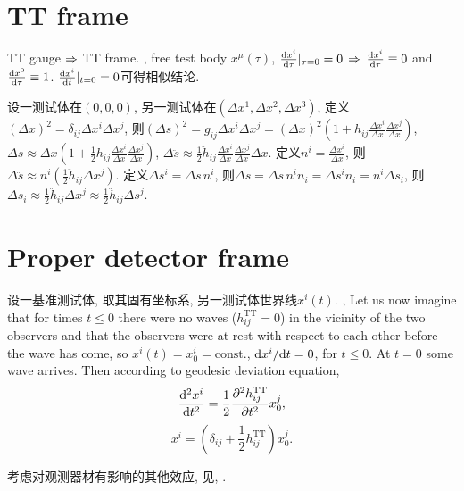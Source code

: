 \section{TT frame}

TT gauge $\Rightarrow$ TT frame. \cite{Maggiore2014}, free test body $x^\mu(\tau)$, $\frac{\mathrm{d} x^i}{\mathrm{d} \tau}|_{\tau=0}=0$ $\Rightarrow$ $\frac{\mathrm{d} x^i}{\mathrm{d} \tau}\equiv0$ and $\frac{\mathrm{d} x^0}{\mathrm{d} \tau}\equiv1$. $\frac{\mathrm{d} x^i}{\mathrm{d} t}|_{t=0}=0$可得相似结论.

设一测试体在$(0,0,0)$, 另一测试体在$(\Delta x^1,\Delta x^2,\Delta x^3)$, 定义$(\Delta x)^2=\delta_{ij}\Delta x^i\Delta x^j$, 则$(\Delta s)^2=g_{ij}\Delta x^i\Delta x^j=(\Delta x)^2(1+h_{ij}\frac{\Delta x^i}{\Delta x}\frac{\Delta x^j}{\Delta x})$, $\Delta s\approx\Delta x(1+\frac{1}{2}h_{ij}\frac{\Delta x^i}{\Delta x}\frac{\Delta x^j}{\Delta x})$, $\Delta \ddot{s}\approx\frac{1}{2}\ddot{h}_{ij}\frac{\Delta x^i}{\Delta x}\frac{\Delta x^j}{\Delta x}\Delta x$. 定义$n^i=\frac{\Delta x^i}{\Delta x}$, 则$\Delta \ddot{s}\approx n^i(\frac{1}{2}\ddot{h}_{ij}\Delta x^j)$. 定义$\Delta s^i=\Delta s\,n^i$, 则$\Delta s=\Delta s\,n^in_i=\Delta s^in_i=n^i\Delta s_i$, 则$\Delta s_i\approx \frac{1}{2}\ddot{h}_{ij}\Delta x^j\approx\frac{1}{2}\ddot{h}_{ij}\Delta s^j$.

\section{Proper detector frame}

设一基准测试体, 取其固有坐标系, 另一测试体世界线$x^{i}(t)$. \cite{Jaranowski2009}, Let us now imagine that for times $t \le 0$ there were no waves ($h^\text{TT}_{ij} = 0$) in the vicinity of the two observers and that the observers were at rest with respect to each other before the wave has come, so $x^i(t) = x^i_0 = \text{const.}$, $\mathrm{d} x^i/\mathrm{d} t = 0$, for $t \le 0$. At $t = 0$ some wave arrives. Then according to geodesic deviation equation,
\begin{equation}
    \frac{\mathrm{d}^2x^i}{\mathrm{d} t^2}=\frac{1}{2}\frac{\partial^2h^\text{TT}_{ij}}{\partial t^2}x^j_0,
\end{equation}
\begin{equation}
    x^i=(\delta_{ij}+\frac{1}{2}h^\text{TT}_{ij})x^j_0.
\end{equation}

考虑对观测器材有影响的其他效应, 见\cite{Maggiore2014}, \cite{Ni1978}.
